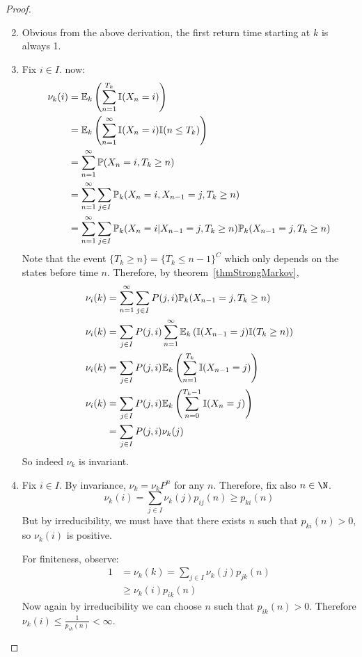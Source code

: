 \documentclass[../Main.tex]{subfiles}
\begin{document}
\begin{proof}
    \begin{enumerate}
        \setcounter{enumi}{1}
        \item Obvious from the above derivation, the first return time starting at $k$ is always 1.
        \item Fix $i \in I$. now:
            \begin{align*}
                \nu_k(i) &= \mathbb{E}_k\left(\sum_{n=1}^{T_k} \mathbb{I}(X_n = i)\right) \\
                &= \mathbb{E}_k\left(\sum_{n=1}^{\infty}\mathbb{I}(X_n = i) \mathbb{I}(n \leq T_k)\right) \\
                &= \sum_{n=1}^{\infty} \mathbb{P}(X_n = i, T_k \geq n) \\
                &= \sum_{n=1}^{\infty} \sum_{j \in I} \mathbb{P}_k(X_n = i, X_{n-1} = j, T_k \geq n) \\
                &= \sum_{n=1}^{\infty} \sum_{j \in I} \mathbb{P}_k(X_n = i | X_{n-1} = j, T_k \geq n) \mathbb{P}_k(X_{n-1} = j, T_k \geq n) \\
            \end{align*}
            Note that the event $\{T_k \geq n\} = \{T_k \leq n-1\}^C$ which only depends on the states before time $n$. Therefore, by theorem~\ref{thmStrongMarkov},
            \begin{align*}
                \nu_i(k)&= \sum_{n=1}^{\infty} \sum_{j \in I} P(j, i) \mathbb{P}_k(X_{n-1} = j, T_k \geq n) \\
                \nu_i(k)&= \sum_{j \in I} P(j, i) \sum_{n=1}^{\infty} \mathbb{E}_k\left(\mathbb{I}(X_{n-1} = j) \mathbb{I}(T_k \geq n)\right) \\
                \nu_i(k) &= \sum_{j \in I} P(j, i) \mathbb{E}_k\left(\sum_{n=1}^{T_k} \mathbb{I}(X_{n-1} = j)\right) \\
                \nu_i(k) &= \sum_{j \in I} P(j, i) \mathbb{E}_k\left(\sum_{n=0}^{T_k - 1} \mathbb{I}(X_{n} = j)\right) \\
                &= \sum_{j \in I} P(j, i) \nu_k(j)
            \end{align*}
            So indeed $\nu_k$ is invariant.
        \setcounter{enumi}{0}
        \item Fix $i \in I$. By invariance, $\nu_k = \nu_kP^n$ for any $n$. Therefore, fix also $n \in \N$.
            \begin{equation*}
                \nu_k(i) = \sum_{j \in I} \nu_k(j) p_{ij}(n) \geq p_{ki}(n)
            \end{equation*}
            But by irreducibility, we must have that there exists $n$ such that $p_{ki}(n) > 0$, so $\nu_k(i)$ is positive.

            For finiteness, observe:
            \begin{align*}
                1 &= \nu_k(k) = \sum_{j \in I} \nu_k(j) p_{jk}(n) \\
                &\geq \nu_k(i) p_{ik}(n)
            \end{align*}
            Now again by irreducibility we can choose $n$ such that $p_{ik}(n) > 0$. Therefore $\nu_k(i) \leq \frac{1}{p_{ik}(n)} < \infty$.
    \end{enumerate}
\end{proof}
\end{document}
